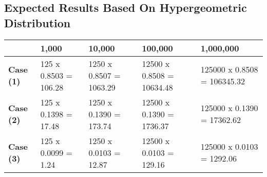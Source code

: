 \documentclass[letterpaper, 10pt,DIV=13]{scrartcl}
\numberwithin{equation}{section} %
\numberwithin{figure}{section} %
\numberwithin{table}{section} %
\begin{document}
\subsection{Expected Results Based On Hypergeometric Distribution}
\lstset{numbers=left, numberstyle=\tiny, stepnumber=1, numbersep=5pt, basicstyle=\footnotesize\ttfamily}
\begin{center}
\begin{tabular}{ |p{3cm}|p{3cm}|p{3cm}|p{3cm}|p{3cm}| }
  \hline
  \textbf{} & \textbf{1,000} & \textbf{10,000} & \textbf{100,000} & \textbf{1,000,000} \\
  \hline
  \textbf{Case (1)} & 125 x 0.8503 = 106.28 & 1250 x 0.8507 = 1063.29 & 12500 x 0.8508 = 10634.48 & 125000 x 0.8508 = 106345.32\\ 
  \hline
  \textbf{Case (2)} & 125 x 0.1398 = 17.48 & 1250 x 0.1390 = 173.74 & 12500 x 0.1390 = 1736.37 & 125000 x 0.1390 = 17362.62\\ 
  \hline
  \textbf{Case (3)} & 125 x 0.0099 = 1.24 & 1250 x 0.0103 = 12.87 & 12500 x 0.0103 = 129.16 & 125000 x 0.0103 = 1292.06\\ 
  \hline
\end{tabular}
\end{center}
\end{document}
